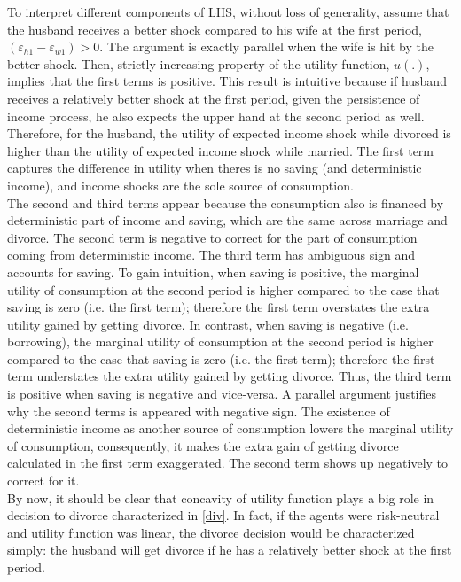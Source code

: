 To interpret different components of LHS, without loss of generality, assume that the husband receives a better shock compared to his wife at the first period, $ (\varepsilon_{h1} - \varepsilon_{w1}) > 0$. The argument is exactly parallel when the wife is hit by the better shock. Then, strictly increasing property of the utility function, $u(.)$, implies that the first terms is positive. This result is intuitive because if husband receives a relatively better shock at the first period, given the persistence of income process, he also expects the upper hand at the second period as well. Therefore, for the husband, the utility of expected income shock while divorced is higher than the utility of expected income shock while married. The first term captures the difference in utility when theres is no saving (and deterministic income), and income shocks are the sole source of consumption. \\

The second and third terms appear because the consumption also is financed by deterministic part of income and saving, which are the same across marriage and divorce. The second term is negative to correct for the part of consumption coming from deterministic income. The third term has ambiguous sign and accounts for saving. To gain intuition, when saving is positive, the marginal utility of consumption at the second period is higher compared to the case that saving is zero (i.e. the first term); therefore the first term overstates the extra utility gained by getting divorce. In contrast, when saving is negative (i.e. borrowing), the marginal utility of consumption at the second period is higher compared to the case that saving is zero (i.e. the first term); therefore the first term understates the extra utility gained by getting divorce. Thus, the third term is positive when saving is negative and vice-versa. A parallel argument justifies why the second terms is appeared with negative sign. The existence of deterministic income as another source of consumption lowers the marginal utility of consumption, consequently, it makes the extra gain of getting divorce calculated in the first term exaggerated. The second term shows up negatively to correct for it.  \\

By now, it should be clear that concavity of utility function plays a big role in decision to divorce characterized in  \eqref{div}. In fact, if the agents were risk-neutral and utility function was linear, the divorce decision would be characterized simply: the husband will get divorce if he has a relatively better shock at the first period. \\


